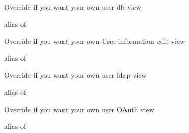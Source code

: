 \documentclass[letterpaper,10pt,english]{sphinxmanual}
\begin{document}
\begin{fulllineitems}
\begin{fulllineitems}
\end{fulllineitems}


\begin{fulllineitems}
\label{api:flask.ext.appbuilder.security.manager.BaseSecurityManager.userdbmodelview}
Override if you want your own user db view

alias of 

\end{fulllineitems}


\begin{fulllineitems}
\label{api:flask.ext.appbuilder.security.manager.BaseSecurityManager.userinfoeditview}
Override if you want your own User information edit view

alias of 

\end{fulllineitems}


\begin{fulllineitems}
\label{api:flask.ext.appbuilder.security.manager.BaseSecurityManager.userldapmodelview}
Override if you want your own user ldap view

alias of 

\end{fulllineitems}


\begin{fulllineitems}
\label{api:flask.ext.appbuilder.security.manager.BaseSecurityManager.useroauthmodelview}
Override if you want your own user OAuth view

alias of 

\end{fulllineitems}



\end{fulllineitems}
\end{document}
